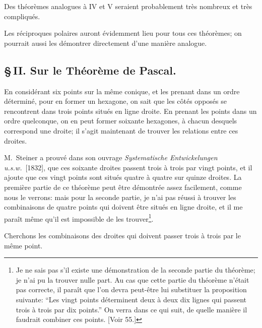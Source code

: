 \documentclass[12pt,a4paper]{article}
\begin{document}
Des th\'eor\`emes analogues \`a IV et V seraient probablement tr\`es nombreux et tr\`es compliqu\'es.

Les r\'eciproques polaires auront \'evidemment lieu pour tous ces th\'eor\`emes; on pourrait aussi les d\'emontrer directement d'une mani\`ere analogue.

\subsection*{\S\,II. Sur le Th\'eor\`eme de Pascal.}

En consid\'erant six points sur la m\^eme conique, et les prenant dans un ordre d\'etermin\'e, pour en former un hexagone, on sait que les c\^ot\'es oppos\'es se rencontrent dans trois points situ\'es en ligne droite. En prenant les points dans un ordre quelconque, on en peut former soixante hexagones, \`a chacun desquels correspond une droite; il s'agit maintenant de trouver les relations entre ces droites.

M.~Steiner a prouv\'e dans son ouvrage \emph{Systematische Entwickelungen u.s.w.}~[1832], que ces soixante droites passent trois \`a trois par vingt points, et il ajoute que ces vingt points sont situ\'es quatre \`a quatre sur quinze droites. La premi\`ere partie de ce th\'eor\`eme peut \^etre d\'emontr\'ee assez facilement, comme nous le verrons: mais pour la seconde partie, je n'ai pas r\'eussi \`a trouver les combinaisons de quatre points qui doivent \^etre situ\'es en ligne droite, et il me para\^it m\^eme qu'il est impossible de les trouver\footnote{Je ne sais pas s'il existe une d\'emonstration de la seconde partie du th\'eor\`eme; je n'ai pu la trouver nulle part. Au cas que cette partie du th\'eor\`eme n'\'etait pas correcte, il para\^it que l'on devra peut-\^etre lui substituer la proposition suivante: ``Les vingt points d\'eterminent deux \`a deux dix lignes qui passent trois \`a trois par dix points.'' On verra dans ce qui suit, de quelle mani\`ere il faudrait combiner ces points. [Voir 55.]}.

Cherchons les combinaisons des droites qui doivent passer trois \`a trois par le m\^eme point.
\end{document}
